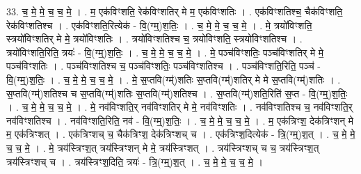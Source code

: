 \documentclass[17pt]{extarticle}
\begin{document}
33. च॒ मे॒ मे॒ च॒ च॒ मे॒ । . म॒ एक॑विꣳशति॒ रेक॑विꣳशतिर् मे म॒ एक॑विꣳशतिः । . एक॑विꣳशतिश्च॒ चैक॑विꣳशति॒ रेक॑विꣳशतिश्च । . एक॑विꣳशति॒रित्येक॑ - वि॒(ग्म्॒)श॒तिः॒ । . च॒ मे॒ मे॒ च॒ च॒ मे॒ । . मे॒ त्रयो॑विꣳशति॒ स्त्रयो॑विꣳशतिर् मे मे॒ त्रयो॑विꣳशतिः । . त्रयो॑विꣳशतिश्च च॒ त्रयो॑विꣳशति॒ स्त्रयो॑विꣳशतिश्च । . त्रयो॑विꣳशति॒रिति॒ त्रयः॑ - वि॒(ग्म्॒)श॒तिः॒ । . च॒ मे॒ मे॒ च॒ च॒ मे॒ । . मे॒ पञ्च॑विꣳशतिः॒ पञ्च॑विꣳशतिर् मे मे॒ पञ्च॑विꣳशतिः । . पञ्च॑विꣳशतिश्च च॒ पञ्च॑विꣳशतिः॒ पञ्च॑विꣳशतिश्च । . पञ्च॑विꣳशति॒रिति॒ पञ्च॑ - वि॒(ग्म्॒)श॒तिः॒ । . च॒ मे॒ मे॒ च॒ च॒ मे॒ । . मे॒ स॒प्तवि(ग्म्॑)शतिः स॒प्तवि(ग्म्॑)शतिर् मे मे स॒प्तवि(ग्म्॑)शतिः । . स॒प्तवि(ग्म्॑)शतिश्च च स॒प्तवि(ग्म्॑)शतिः स॒प्तवि(ग्म्॑)शतिश्च । . स॒प्तवि(ग्म्॑)शति॒रिति॑ स॒प्त - वि॒(ग्म्॒)श॒तिः॒ । . च॒ मे॒ मे॒ च॒ च॒ मे॒ । . मे॒ नव॑विꣳशति॒र् नव॑विꣳशतिर् मे मे॒ नव॑विꣳशतिः । . नव॑विꣳशतिश्च च॒ नव॑विꣳशति॒र् नव॑विꣳशतिश्च । . नव॑विꣳशति॒रिति॒ नव॑ - वि॒(ग्म्॒)श॒तिः॒ । . च॒ मे॒ मे॒ च॒ च॒ मे॒ । . म॒ एक॑त्रिꣳश॒ देक॑त्रिꣳशन् मे म॒ एक॑त्रिꣳशत् । . एक॑त्रिꣳशच् च॒ चैक॑त्रिꣳश॒ देक॑त्रिꣳशच् च । . एक॑त्रिꣳश॒दित्येक॑ - त्रि॒(ग्म्॒)श॒त् । . च॒ मे॒ मे॒ च॒ च॒ मे॒ । . मे॒ त्रय॑स्त्रिꣳश॒त् त्रय॑स्त्रिꣳशन् मे मे॒ त्रय॑स्त्रिꣳशत् । . त्रय॑स्त्रिꣳशच् च च॒ त्रय॑स्त्रिꣳश॒त् त्रय॑स्त्रिꣳशच् च । . त्रय॑स्त्रिꣳश॒दिति॒ त्रयः॑ - त्रि॒(ग्म्॒)श॒त् । . च॒ मे॒ मे॒ च॒ च॒ मे॒ । \newline
\end{document}
